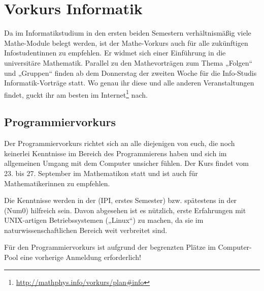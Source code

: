 \section{Vorkurs Informatik}
Da im Informatikstudium in den ersten beiden Semestern verhältnismäßig viele Mathe-Module belegt werden, ist der Mathe-Vorkurs auch für alle zukünftigen Infostudentinnen zu empfehlen. Er widmet sich einer Einführung in die universitäre Mathematik.
Parallel zu den Mathevorträgen zum Thema „Folgen“ und „Gruppen“ finden ab dem Donnerstag der zweiten Woche für die Info-Studis Informatik-Vorträge statt. Wo genau ihr diese und alle anderen Veranstaltungen findet, guckt ihr am besten im Internet\footnote{\url{http://mathphys.info/vorkurs/plan\#info}} nach.%


\subsection{Programmiervorkurs}
Der Programmiervorkurs richtet sich an alle diejenigen von euch, die noch keinerlei Kenntnisse im Bereich des Programmierens haben und sich im allgemeinen Umgang mit dem Computer unsicher fühlen. Der Kurs findet vom 23. bis 27. September im Mathematikon statt und ist auch für Mathematikerinnen zu empfehlen.

Die Kenntnisse werden in der  (\gls{IPI}, erstes Semester) bzw. spätestens in der  (\gls{Num0}) hilfreich sein. Davon abgesehen ist es nützlich, erste Erfahrungen mit UNIX-artigen Betriebssystemen („Linux“) zu machen, da sie im naturwissenschaftlichen Bereich weit verbreitet sind.

Für den Programmiervorkurs ist aufgrund der begrenzten Plätze im Computer-Pool eine vorherige Anmeldung erforderlich!
